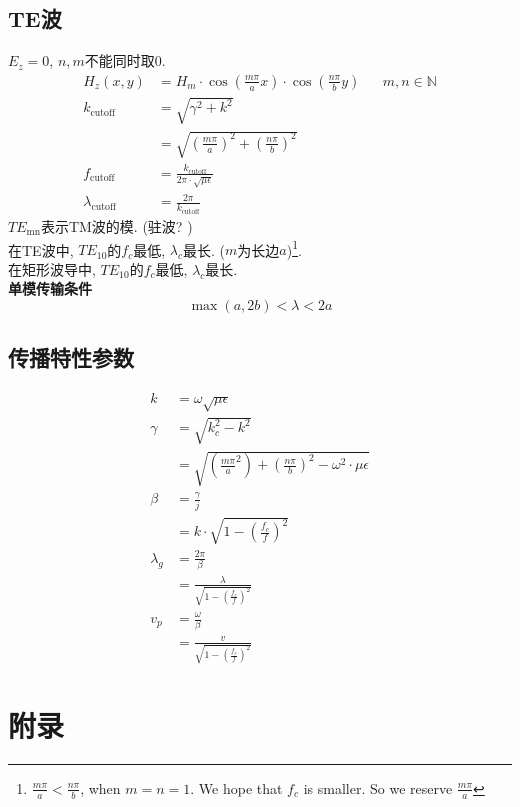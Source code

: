 \documentclass[a4paper]{report}
\begin{document}
\section{TE波}
$E_z=0$, $n,m$不能同时取0. 
\begin{align*}
    H_z(x,y)&=H_m\cdot \cos(\frac{m\pi}{a}x)\cdot \cos(\frac{n\pi}{b}y)&& m,n\in\mathbb{N} \\
    k_\text{cutoff}&=\sqrt{\gamma^2+k^2}\\
    &=\sqrt{(\frac{m\pi}{a})^2+(\frac{n\pi}{b})^2}\\
    f_{\text{cutoff}}&=\frac{k_\text{cutoff}}{2\pi\cdot\sqrt{\mu\epsilon}}\\
    \lambda_\text{cutoff}&=\frac{2\pi}{k_\text{cutoff}}
\end{align*}
$TE_\text{mn}$表示TM波的模. (驻波? )\\
在TE波中, $TE_\text{10}$的$f_c$最低, $\lambda_c$最长. ($m$为长边$a$)\footnote{$\frac{m\pi}{a}<\frac{n\pi}{b}$, when $m=n=1$. We hope that $f_c$ is smaller. So we reserve $\frac{m\pi}{a}$}. \\
在矩形波导中, $TE_\text{10}$的$f_c$最低, $\lambda_c$最长. \\
\textbf{单模传输条件}
$$\max(a,2b)<\lambda<2a$$

\section{传播特性参数}
\begin{align*}
    k&=\omega\sqrt{\mu\epsilon}\\
    \gamma&=\sqrt{k_c^2-k^2}\\
    &=\sqrt{(\frac{m\pi}{a}^2)+(\frac{n\pi}{b})^2-\omega^2\cdot \mu\epsilon}\\
    \beta&=\frac{\gamma}{j}\\
    &=k\cdot\sqrt{1-(\frac{f_c}{f})^2}\\
    \lambda_g&=\frac{2\pi}{\beta}\\
    &=\frac{\lambda}{\sqrt{1-(\frac{f_c}{f})^2}}\\
    v_p&=\frac{\omega}{\beta}\\
    &=\frac{v}{\sqrt{1-(\frac{f_c}{f})^2}}
\end{align*}
\chapter{附录}
\end{document}
